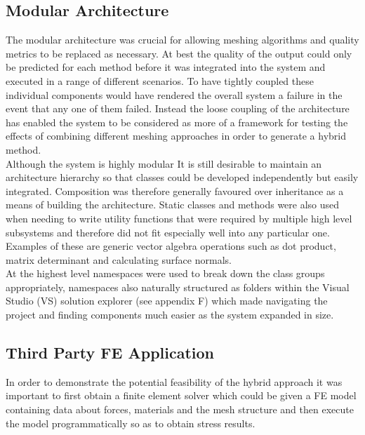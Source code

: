 \subsection{Modular Architecture}
The modular architecture was crucial for allowing meshing algorithms and quality metrics to be replaced as necessary. At best the quality of the output could only be predicted for each method before it was integrated into the system and executed in a range of different scenarios. To have tightly coupled these individual components would have rendered the overall system a failure in the event that any one of them failed. Instead the loose coupling of the architecture has enabled the system to be considered as more of a framework for testing the effects of combining different meshing approaches in order to generate a hybrid method.\\

\noindent
Although the system is highly modular It is still desirable to maintain an architecture hierarchy so that classes could be developed independently but easily integrated. Composition was therefore generally favoured over inheritance as a means of building the architecture. Static classes and methods were also used when needing to write utility functions that were required by multiple high level subsystems and therefore did not fit especially well into any particular one. Examples of these are generic vector algebra operations such as dot product, matrix determinant and calculating surface normals. \\ 

\noindent
At the highest level namespaces were used to break down the class groups appropriately, namespaces also naturally structured as folders within the Visual Studio (VS) solution explorer (see appendix F) which made navigating the project and finding components much easier as the system expanded in size.

\subsection{Third Party FE Application}
In order to demonstrate the potential feasibility of the hybrid approach it was important to first obtain a finite element solver which could be given a FE model containing data about forces, materials and the mesh structure and then execute the model programmatically so as to obtain stress results. \\ 

